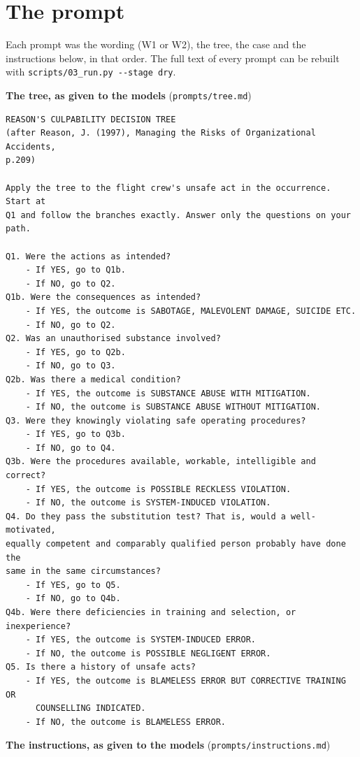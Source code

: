 \documentclass[11pt]{article}
\begin{document}
\appendix
\hypertarget{the-prompt}{%
\section{The prompt}\label{the-prompt}}

Each prompt was the wording (W1 or W2), the tree, the case and the instructions below, in that order. The full text of every prompt can be rebuilt with \texttt{scripts/03\_run.py\ -\/-stage\ dry}.

\textbf{The tree, as given to the models} (\texttt{prompts/tree.md})

{\footnotesize\linespread{1}\selectfont
\begin{verbatim}
REASON'S CULPABILITY DECISION TREE
(after Reason, J. (1997), Managing the Risks of Organizational Accidents,
p.209)

Apply the tree to the flight crew's unsafe act in the occurrence. Start at
Q1 and follow the branches exactly. Answer only the questions on your
path.

Q1. Were the actions as intended?
    - If YES, go to Q1b.
    - If NO, go to Q2.
Q1b. Were the consequences as intended?
    - If YES, the outcome is SABOTAGE, MALEVOLENT DAMAGE, SUICIDE ETC.
    - If NO, go to Q2.
Q2. Was an unauthorised substance involved?
    - If YES, go to Q2b.
    - If NO, go to Q3.
Q2b. Was there a medical condition?
    - If YES, the outcome is SUBSTANCE ABUSE WITH MITIGATION.
    - If NO, the outcome is SUBSTANCE ABUSE WITHOUT MITIGATION.
Q3. Were they knowingly violating safe operating procedures?
    - If YES, go to Q3b.
    - If NO, go to Q4.
Q3b. Were the procedures available, workable, intelligible and correct?
    - If YES, the outcome is POSSIBLE RECKLESS VIOLATION.
    - If NO, the outcome is SYSTEM-INDUCED VIOLATION.
Q4. Do they pass the substitution test? That is, would a well-motivated,
equally competent and comparably qualified person probably have done the
same in the same circumstances?
    - If YES, go to Q5.
    - If NO, go to Q4b.
Q4b. Were there deficiencies in training and selection, or inexperience?
    - If YES, the outcome is SYSTEM-INDUCED ERROR.
    - If NO, the outcome is POSSIBLE NEGLIGENT ERROR.
Q5. Is there a history of unsafe acts?
    - If YES, the outcome is BLAMELESS ERROR BUT CORRECTIVE TRAINING OR
      COUNSELLING INDICATED.
    - If NO, the outcome is BLAMELESS ERROR.
\end{verbatim}
}

\textbf{The instructions, as given to the models} (\texttt{prompts/instructions.md})
\end{document}
